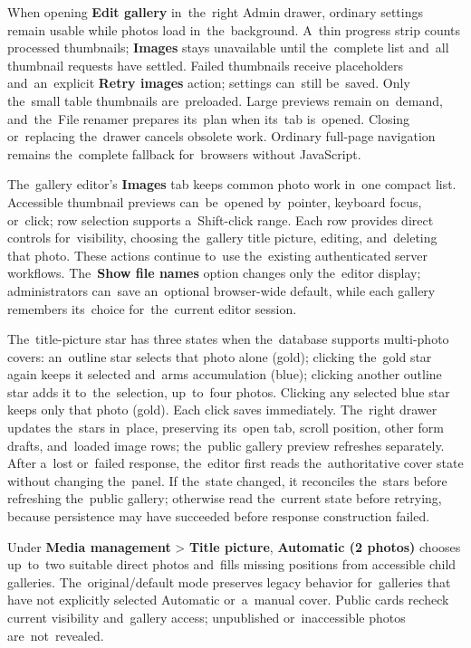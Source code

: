 \documentclass[11pt,a4paper]{article}
\newcommand{\ui}[1]{\textbf{#1}}
\begin{document}
When opening \ui{Edit gallery} in~the~right Admin drawer, ordinary settings
remain usable while photos load in~the~background. A~thin progress strip counts
processed thumbnails; \ui{Images} stays unavailable until the~complete list
and~all thumbnail requests have settled. Failed thumbnails receive placeholders
and~an~explicit \ui{Retry images} action; settings can~still be~saved. Only
the~small table thumbnails are~preloaded. Large previews remain on~demand,
and~the~File renamer prepares its~plan when its~tab is~opened. Closing
or~replacing the~drawer cancels obsolete work. Ordinary full-page navigation
remains the~complete fallback for~browsers without JavaScript.

The~gallery editor's \ui{Images} tab keeps common photo work in~one compact
list. Accessible thumbnail previews can~be~opened by~pointer, keyboard focus,
or~click; row selection supports a~Shift-click range. Each row provides direct
controls for~visibility, choosing the~gallery title picture, editing,
and~deleting that photo. These actions continue to~use the~existing
authenticated server workflows. The~\ui{Show file names} option changes only
the~editor display; administrators can~save an~optional browser-wide default,
while each gallery remembers its~choice for~the~current editor session.

The~title-picture star has three states when the~database supports multi-photo
covers: an~outline star selects that photo alone (gold); clicking the~gold star
again keeps it selected and~arms accumulation (blue); clicking another outline
star adds it to~the~selection, up~to~four photos. Clicking any selected blue
star keeps only that photo (gold). Each click saves immediately. The~right
drawer updates the~stars in~place, preserving its~open tab, scroll position,
other form drafts, and~loaded image rows; the~public gallery preview refreshes
separately. After a~lost or~failed response, the~editor first reads
the~authoritative cover state without changing the~panel. If the~state changed,
it reconciles the~stars before refreshing the~public gallery; otherwise read
the~current state before retrying, because persistence may have succeeded before
response construction failed.

Under \ui{Media management} > \ui{Title picture}, \ui{Automatic (2 photos)}
chooses up~to~two suitable direct photos and~fills missing positions from
accessible child galleries. The~original/default mode preserves legacy behavior
for~galleries that have not explicitly selected Automatic or~a~manual cover.
Public cards recheck current visibility and~gallery access; unpublished
or~inaccessible photos are~not~revealed.
\end{document}
